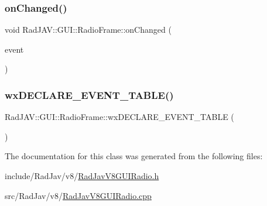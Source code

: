 \subsubsection{\texorpdfstring{on\+Changed()}{onChanged()}}
{\footnotesize\ttfamily void Rad\+J\+A\+V\+::\+G\+U\+I\+::\+Radio\+Frame\+::on\+Changed (\begin{DoxyParamCaption}\item[{wx\+Command\+Event \&}]{event }\end{DoxyParamCaption})}

\mbox{\label{class_rad_j_a_v_1_1_g_u_i_1_1_radio_frame_a2b6cec7a7a3d46c4b8dd94f946a05413}} 
\subsubsection{\texorpdfstring{wx\+D\+E\+C\+L\+A\+R\+E\+\_\+\+E\+V\+E\+N\+T\+\_\+\+T\+A\+B\+L\+E()}{wxDECLARE\_EVENT\_TABLE()}}
{\footnotesize\ttfamily Rad\+J\+A\+V\+::\+G\+U\+I\+::\+Radio\+Frame\+::wx\+D\+E\+C\+L\+A\+R\+E\+\_\+\+E\+V\+E\+N\+T\+\_\+\+T\+A\+B\+LE (\begin{DoxyParamCaption}{ }\end{DoxyParamCaption})\hspace{0.3cm}{\ttfamily [protected]}}



The documentation for this class was generated from the following files\+:\begin{DoxyCompactItemize}
\item 
include/\+Rad\+Jav/v8/\mbox{\hyperlink{_rad_jav_v8_g_u_i_radio_8h}{Rad\+Jav\+V8\+G\+U\+I\+Radio.\+h}}\item 
src/\+Rad\+Jav/v8/\mbox{\hyperlink{_rad_jav_v8_g_u_i_radio_8cpp}{Rad\+Jav\+V8\+G\+U\+I\+Radio.\+cpp}}\end{DoxyCompactItemize}
